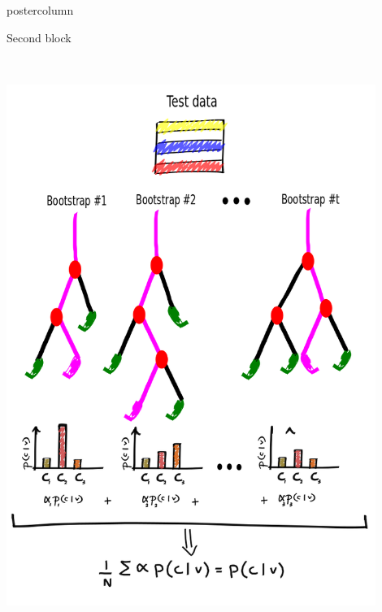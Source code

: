 \documentclass[final]{beamer}
\begin{document}
\begin{frame}
\begin{columns}
\begin{column}{.33\textwidth}
\begin{beamercolorbox}[center,wd=\textwidth]{postercolumn}
\begin{minipage}[T]{.95\textwidth}
{\begin{block}{Second block}
\begin{itemize}
\begin{columns}
\begin{column}{.44\textwidth}
            		\\
            			\includegraphics[width = 0.9\textwidth, height = 0.15\textheight]{images/framework/RF_test.png}
            		\end{column}
            \end{columns}
            \end{itemize}
            \end{block}          
            \vfill
         
}
\end{minipage}
\end{beamercolorbox}
\end{column}
\end{columns}
\end{frame}
\end{document}
